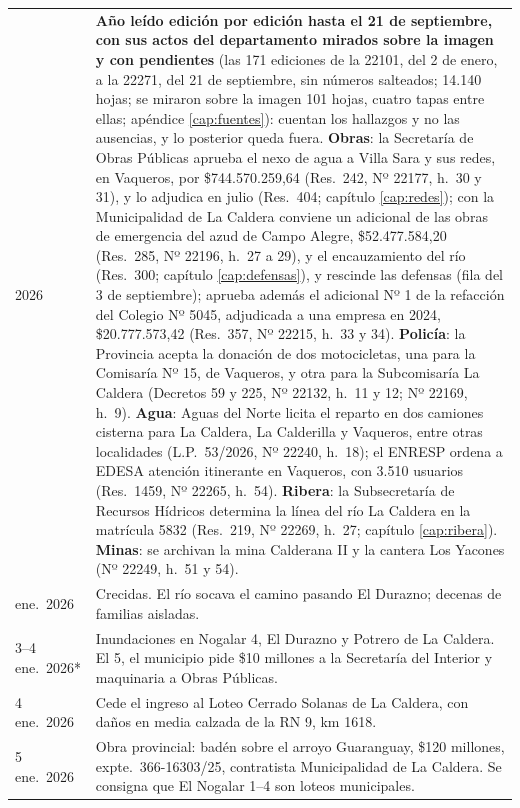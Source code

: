 \begin{longtable}{@{}p{2.7cm}p{10.3cm}@{}}
2026 & \textbf{Año leído edición por edición hasta el 21 de septiembre, con sus actos del departamento mirados sobre la imagen y con pendientes} (las 171 ediciones de la 22101, del 2 de enero, a la 22271, del 21 de septiembre, sin números salteados; 14.140 hojas; se miraron sobre la imagen 101 hojas, cuatro tapas entre ellas; apéndice \ref{cap:fuentes}): cuentan los hallazgos y no las ausencias, y lo posterior queda fuera. \textbf{Obras}: la Secretaría de Obras Públicas aprueba el nexo de agua a Villa Sara y sus redes, en Vaqueros, por \$744.570.259,64 (Res.\ 242, Nº 22177, h.\ 30 y 31), y lo adjudica en julio (Res.\ 404; capítulo \ref{cap:redes}); con la Municipalidad de La Caldera conviene un adicional de las obras de emergencia del azud de Campo Alegre, \$52.477.584,20 (Res.\ 285, Nº 22196, h.\ 27 a 29), y el encauzamiento del río (Res.\ 300; capítulo \ref{cap:defensas}), y rescinde las defensas (fila del 3 de septiembre); aprueba además el adicional Nº 1 de la refacción del Colegio Nº 5045, adjudicada a una empresa en 2024, \$20.777.573,42 (Res.\ 357, Nº 22215, h.\ 33 y 34). \textbf{Policía}: la Provincia acepta la donación de dos motocicletas, una para la Comisaría Nº 15, de Vaqueros, y otra para la Subcomisaría La Caldera (Decretos 59 y 225, Nº 22132, h.\ 11 y 12; Nº 22169, h.\ 9). \textbf{Agua}: Aguas del Norte licita el reparto en dos camiones cisterna para La Caldera, La Calderilla y Vaqueros, entre otras localidades (L.P.\ 53/2026, Nº 22240, h.\ 18); el ENRESP ordena a EDESA atención itinerante en Vaqueros, con 3.510 usuarios (Res.\ 1459, Nº 22265, h.\ 54). \textbf{Ribera}: la Subsecretaría de Recursos Hídricos determina la línea del río La Caldera en la matrícula 5832 (Res.\ 219, Nº 22269, h.\ 27; capítulo \ref{cap:ribera}). \textbf{Minas}: se archivan la mina Calderana II y la cantera Los Yacones (Nº 22249, h.\ 51 y 54). \\
ene.\ 2026 & Crecidas. El río socava el camino pasando El Durazno; decenas de familias aisladas. \\
3--4 ene.\ 2026* & Inundaciones en Nogalar 4, El Durazno y Potrero de La Caldera. El 5, el municipio pide \$10 millones a la Secretaría del Interior y maquinaria a Obras Públicas. \\
4 ene.\ 2026 & Cede el ingreso al Loteo Cerrado Solanas de La Caldera, con daños en media calzada de la RN 9, km 1618. \\
5 ene.\ 2026 & Obra provincial: badén sobre el arroyo Guaranguay, \$120 millones, expte.\ 366-16303/25, contratista Municipalidad de La Caldera. Se consigna que El Nogalar 1--4 son loteos municipales. \\

\end{longtable}
